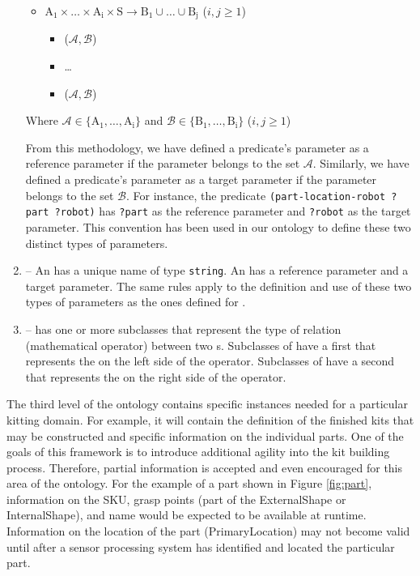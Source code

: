 \begin{enumerate}
\begin{itemize}
 \item $\mathrm{A_1\times \dots\times A_i\times S\rightarrow B_1\cup\dots\cup B_j}$ ($i, j\geq 1$)
  \begin{itemize}
  \item {}($\mathcal{A,B}$)
  \item \ldots
  \item {}($\mathcal{A,B}$)
  \end{itemize}
\end{itemize}

Where $\mathcal{A} \in \mathrm{\{A_1,\ldots,A_i\}}$ and $\mathcal{B} \in \mathrm{\{B_1,\ldots,B_i\}}$ ($i, j\geq 1$)

From this methodology, we have defined a predicate's parameter as a reference parameter if the parameter belongs to the set $\mathcal{A}$. Similarly, we have defined a predicate's parameter as a target parameter if the parameter belongs to the set $\mathcal{B}$. For instance, the predicate \texttt{(part-location-robot ?part ?robot)} has \texttt{?part} as the reference parameter and \texttt{?robot} as the target parameter. This convention has been used in our ontology to define these two distinct types of parameters.

\item {} -- An  has a unique name  of type \texttt{string}. An  has a reference parameter and a target parameter. The same rules apply to the definition and use of these two types of parameters as the ones defined for .
\item {} --  has one or more subclasses that represent the type of relation (mathematical operator) between two s. Subclasses of  have a first  that represents the  on the left side of the operator. Subclasses of  have a second  that represents the  on the right side of the operator.
\end{enumerate}

The third level of the ontology contains specific instances needed for a particular kitting domain. For example, it will contain the definition of the finished kits that may be
constructed and specific information on the individual parts. One of the goals of this framework is to introduce additional agility into the kit building process. Therefore,
partial information is accepted and even encouraged for this area of the ontology. For the example of a part shown in Figure \ref{fig:part}, information on the SKU, grasp points 
(part of the ExternalShape or InternalShape), and name would be expected to be available at runtime. Information on the location of the part (PrimaryLocation) may not
become valid until after a sensor processing system has identified and located the particular part.
%
